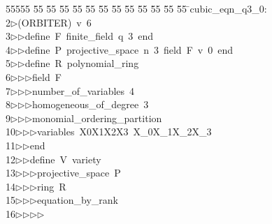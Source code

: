 %
%
\begin{tabbing}
55555 \= 55 \= 55 \= 55 \= 55 \= 55 \= 55 \= 55 \= 55 \= 55 \= 55 \= 55 \= 55 \= \>cubic\_eqn\_q3\_0:\\[0pt]
2\>$\triangleright$\>(ORBITER)\ v\ 6\ \\[0pt]
3\>$\triangleright$\>$\triangleright$\>define\ F\ finite\_field\ q\ 3\ end\ \\[0pt]
4\>$\triangleright$\>$\triangleright$\>define\ P\ projective\_space\ n\ 3\ field\ F\ v\ 0\ end\ \\[0pt]
5\>$\triangleright$\>$\triangleright$\>define\ R\ polynomial\_ring\ \\[0pt]
6\>$\triangleright$\>$\triangleright$\>$\triangleright$\>field\ F\ \\[0pt]
7\>$\triangleright$\>$\triangleright$\>$\triangleright$\>number\_of\_variables\ 4\ \\[0pt]
8\>$\triangleright$\>$\triangleright$\>$\triangleright$\>homogeneous\_of\_degree\ 3\ \\[0pt]
9\>$\triangleright$\>$\triangleright$\>$\triangleright$\>monomial\_ordering\_partition\ \\[0pt]
10\>$\triangleright$\>$\triangleright$\>$\triangleright$\>variables\ X0X1X2X3\ X\_0X\_1X\_2X\_3\ \\[0pt]
11\>$\triangleright$\>$\triangleright$\>end\ \\[0pt]
12\>$\triangleright$\>$\triangleright$\>define\ V\ variety\ \\[0pt]
13\>$\triangleright$\>$\triangleright$\>$\triangleright$\>projective\_space\ P\ \\[0pt]
14\>$\triangleright$\>$\triangleright$\>$\triangleright$\>ring\ R\ \\[0pt]
15\>$\triangleright$\>$\triangleright$\>$\triangleright$\>equation\_by\_rank\ \\[0pt]
16\>$\triangleright$\>$\triangleright$\>$\triangleright$\>$\triangleright$\ \\[0pt]

\end{tabbing}
